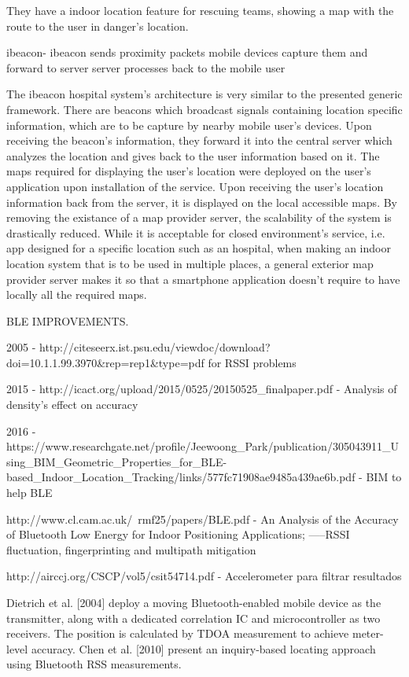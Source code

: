 They have a indoor location feature for rescuing teams, showing a map with the route to the user in danger's location. 


ibeacon- 	ibeacon sends proximity packets
			mobile devices capture them and forward to server
			server processes back to the mobile user

The ibeacon hospital system's architecture is very similar to the presented generic framework. There are beacons which broadcast signals containing location specific information, which are to be capture by nearby mobile user's devices. Upon receiving the beacon's information, they forward it into the central server which analyzes the location and gives back to the user information based on it. The maps required for displaying the user's location were deployed on the user's application upon installation of the service. Upon receiving the user's location information back from the server, it is displayed on the local accessible maps. By removing the existance of a map provider server, the scalability of the system is drastically reduced. While it is acceptable for closed environment's service, i.e. app designed for a specific location such as an hospital, when making an indoor location system that is to be used in multiple places, a general exterior map provider server makes it so that a smartphone application doesn't require to have locally all the required maps.


BLE IMPROVEMENTS.

2005 - http://citeseerx.ist.psu.edu/viewdoc/download?doi=10.1.1.99.3970&rep=rep1&type=pdf for RSSI problems

2015 - http://icact.org/upload/2015/0525/20150525_finalpaper.pdf - Analysis of density's effect on accuracy

2016 - https://www.researchgate.net/profile/Jeewoong_Park/publication/305043911_Using_BIM_Geometric_Properties_for_BLE-based_Indoor_Location_Tracking/links/577fc71908ae9485a439ae6b.pdf -  BIM to help BLE

http://www.cl.cam.ac.uk/~rmf25/papers/BLE.pdf -  An Analysis of the Accuracy of Bluetooth Low Energy for Indoor Positioning Applications;
-----RSSI fluctuation, fingerprinting and multipath mitigation

http://airccj.org/CSCP/vol5/csit54714.pdf - Accelerometer para filtrar resultados




Dietrich et al. [2004] deploy a moving Bluetooth-enabled mobile device as
the transmitter, along with a dedicated correlation IC and microcontroller as two receivers.
The position is calculated by TDOA measurement to achieve meter-level accuracy.
Chen et al. [2010] present an inquiry-based locating approach using Bluetooth
RSS measurements.

